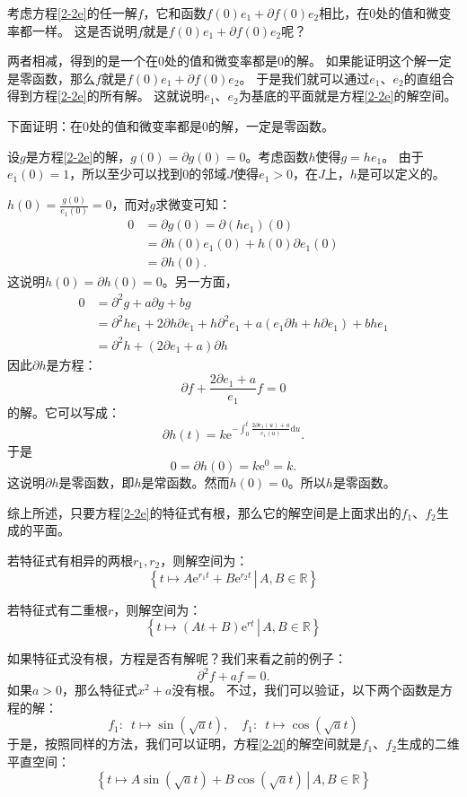 \documentclass[12pt,UTF8]{ctexbook}
\newcommand{\e}{\mathrm{e}}
\theoremstyle{definition}
\theoremstyle{plain}
\begin{document}
考虑方程\eqref{2-2e}的任一解$f$，它和函数$f(0)e_1 + \partial f(0) e_2$相比，在$0$处的值和微变率都一样。
这是否说明$f$就是$f(0)e_1 + \partial f(0) e_2$呢？

两者相减，得到的是一个在$0$处的值和微变率都是$0$的解。
如果能证明这个解一定是零函数，那么$f$就是$f(0)e_1 + \partial f(0) e_2$。
于是我们就可以通过$e_1$、$e_2$的直组合得到方程\eqref{2-2e}的所有解。
这就说明$e_1$、$e_2$为基底的平面就是方程\eqref{2-2e}的解空间。

下面证明：在$0$处的值和微变率都是$0$的解，一定是零函数。

设$g$是方程\eqref{2-2e}的解，$g(0) = \partial g(0) = 0$。考虑函数$h$使得$g = he_1$。
由于$e_1(0) = 1$，所以至少可以找到$0$的邻域$J$使得$e_1 > 0$，在$J$上，$h$是可以定义的。

$h(0) = \frac{g(0)}{e_1(0)} = 0$，而对$g$求微变可知：
\begin{align*}
    0 &= \partial g(0) = \partial (he_1) (0) \\
    &= \partial h (0) e_1(0) + h (0) \partial e_1(0) \\
    &= \partial h (0).
\end{align*}
这说明$h(0) = \partial h(0) = 0$。另一方面，
\begin{align*}
    0 &= \partial^2 g + a \partial g + b g \\
    &= \partial^2 h e_1 + 2 \partial h \partial e_1 + h \partial^2 e_1 + a(e_1\partial h + h \partial e_1) + b h e_1 \\
    &= \partial^2 h  + (2 \partial e_1 + a) \partial h
\end{align*}
因此$\partial h$是方程：
$$ \partial f + \frac{2 \partial e_1 + a}{e_1} f = 0 $$
的解。它可以写成：
$$ \partial h (t) = k \e^{-\int_0^t \frac{2 \partial e_1(u) + a}{e_1(u)} \mathrm{d}u}. $$
于是
$$0 = \partial h (0) = k \e^0 = k.$$
这说明$\partial h$是零函数，即$h$是常函数。然而$h(0) = 0$。所以$h$是零函数。

综上所述，只要方程\eqref{2-2e}的特征式有根，那么它的解空间是上面求出的$f_1$、$f_2$生成的平面。

若特征式有相异的两根$r_1, r_2$，则解空间为：
$$ \left\{\left.t \mapsto A\e^{r_1t} + B\e^{r_2t}\,\right|\, A, B \in \mathbb{R}\right\}$$

若特征式有二重根$r$，则解空间为：
$$ \left\{\left.t \mapsto (At + B)\e^{rt}\,\right|\, A, B \in \mathbb{R}\right\}$$

如果特征式没有根，方程是否有解呢？我们来看之前的例子：
\begin{equation}
    \partial^2 f + af = 0. \label{2-2f}
\end{equation}
如果$a>0$，那么特征式$x^2 + a$没有根。
不过，我们可以验证，以下两个函数是方程的解：
$$ f_1: \,\,\, t\mapsto \sin{(\sqrt{a}t)}, \quad f_1: \,\,\, t\mapsto \cos{(\sqrt{a}t)} $$
于是，按照同样的方法，我们可以证明，方程\eqref{2-2f}的解空间就是$f_1$、$f_2$生成的二维平直空间：
$$ \left\{\left.t \mapsto A\sin{(\sqrt{a}t)} + B\cos{(\sqrt{a}t)}\,\right|\, A, B \in \mathbb{R}\right\}$$
\end{document}
